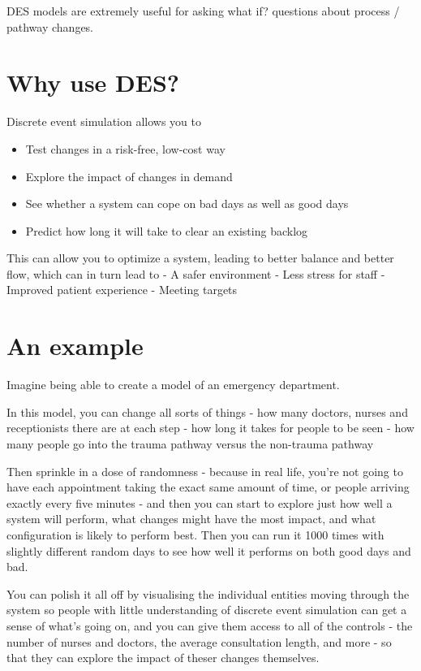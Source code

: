\documentclass[
  letterpaper,
  DIV=11,
  numbers=noendperiod]{scrreprt}
\providecommand{\tightlist}{%
  \setlength{\itemsep}{0pt}\setlength{\parskip}{0pt}}\usepackage{longtable,booktabs,array}
\begin{document}
DES models are extremely useful for asking what if? questions about
process / pathway changes.

\section{Why use DES?}\label{why-use-des}

Discrete event simulation allows you to

\begin{itemize}
\tightlist
\item
  Test changes in a risk-free, low-cost way
\item
  Explore the impact of changes in demand
\item
  See whether a system can cope on bad days as well as good days
\item
  Predict how long it will take to clear an existing backlog
\end{itemize}

This can allow you to optimize a system, leading to better balance and
better flow, which can in turn lead to - A safer environment - Less
stress for staff - Improved patient experience - Meeting targets

\section{An example}\label{an-example}

Imagine being able to create a model of an emergency department.

In this model, you can change all sorts of things - how many doctors,
nurses and receptionists there are at each step - how long it takes for
people to be seen - how many people go into the trauma pathway versus
the non-trauma pathway

Then sprinkle in a dose of randomness - because in real life, you're not
going to have each appointment taking the exact same amount of time, or
people arriving exactly every five minutes - and then you can start to
explore just how well a system will perform, what changes might have the
most impact, and what configuration is likely to perform best. Then you
can run it 1000 times with slightly different random days to see how
well it performs on both good days and bad.

You can polish it all off by visualising the individual entities moving
through the system so people with little understanding of discrete event
simulation can get a sense of what's going on, and you can give them
access to all of the controls - the number of nurses and doctors, the
average consultation length, and more - so that they can explore the
impact of theser changes themselves.
\end{document}
